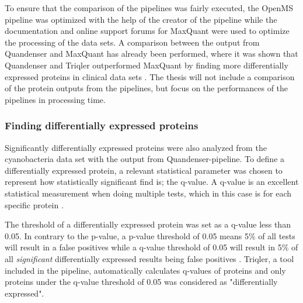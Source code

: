 To ensure that the comparison of the pipelines was fairly executed, the OpenMS pipeline was optimized with the help of the creator of the pipeline while the documentation and online support forums for MaxQuant were used to optimize the processing of the data sets. A comparison between the output from Quandenser and MaxQuant has already been performed, where it was shown that Quandenser and Triqler outperformed MaxQuant by finding more differentially expressed proteins in clinical data sets \cite{quandenser}. The thesis will not include a comparison of the protein outputs from the pipelines, but focus on the performances of the pipelines in processing time.

\subsubsection{Finding differentially expressed proteins}
Significantly differentially expressed proteins were also analyzed from the cyanobacteria data set with the output from Quandenser-pipeline. To define a differentially expressed protein, a relevant statistical parameter was chosen to represent how statistically significant find is; the q-value. A q-value is an excellent statistical measurement when doing multiple tests, which in this case is for each specific protein \cite{q-value}.

The threshold of a differentially expressed protein was set as a q-value less than 0.05. In contrary to the p-value, a p-value threshold of 0.05 means 5\% of all tests will result in a false positives while a q-value threshold of 0.05 will result in 5\% of all \textit{significant} differentially expressed results being false positives \cite{q-value} \cite{nonlinear}. Triqler, a tool included in the pipeline, automatically calculates q-values of proteins and only proteins under the q-value threshold of 0.05 was considered as "differentially expressed".
